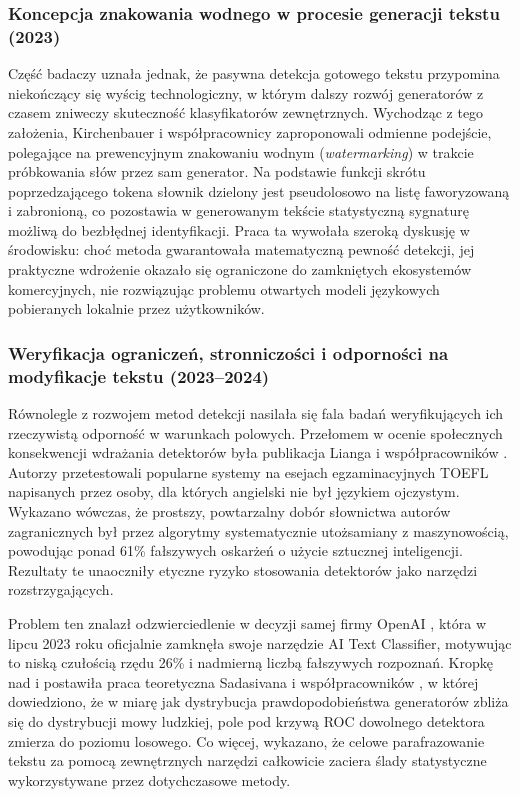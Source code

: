 \subsubsection{Koncepcja znakowania wodnego w procesie generacji tekstu (2023)}

Część badaczy uznała jednak, że pasywna detekcja gotowego tekstu przypomina niekończący się wyścig technologiczny, w którym dalszy rozwój generatorów z czasem zniweczy skuteczność klasyfikatorów zewnętrznych. Wychodząc z tego założenia, Kirchenbauer i współpracownicy \cite{kirchenbauer2023watermark} zaproponowali odmienne podejście, polegające na prewencyjnym znakowaniu wodnym (\textit{watermarking}) w trakcie próbkowania słów przez sam generator. Na podstawie funkcji skrótu poprzedzającego tokena słownik dzielony jest pseudolosowo na listę faworyzowaną i zabronioną, co pozostawia w generowanym tekście statystyczną sygnaturę możliwą do bezbłędnej identyfikacji. Praca ta wywołała szeroką dyskusję w środowisku: choć metoda gwarantowała matematyczną pewność detekcji, jej praktyczne wdrożenie okazało się ograniczone do zamkniętych ekosystemów komercyjnych, nie rozwiązując problemu otwartych modeli językowych pobieranych lokalnie przez użytkowników.

\subsubsection{Weryfikacja ograniczeń, stronniczości i odporności na modyfikacje tekstu (2023--2024)}

Równolegle z rozwojem metod detekcji nasilała się fala badań weryfikujących ich rzeczywistą odporność w warunkach polowych. Przełomem w ocenie społecznych konsekwencji wdrażania detektorów była publikacja Lianga i współpracowników \cite{liang2023gptdetectors}. Autorzy przetestowali popularne systemy na esejach egzaminacyjnych TOEFL napisanych przez osoby, dla których angielski nie był językiem ojczystym. Wykazano wówczas, że prostszy, powtarzalny dobór słownictwa autorów zagranicznych był przez algorytmy systematycznie utożsamiany z maszynowością, powodując ponad 61\% fałszywych oskarżeń o użycie sztucznej inteligencji. Rezultaty te unaoczniły etyczne ryzyko stosowania detektorów jako narzędzi rozstrzygających.

Problem ten znalazł odzwierciedlenie w decyzji samej firmy OpenAI \cite{openai2023classifier}, która w lipcu 2023 roku oficjalnie zamknęła swoje narzędzie AI Text Classifier, motywując to niską czułością rzędu 26\% i nadmierną liczbą fałszywych rozpoznań. Kropkę nad i postawiła praca teoretyczna Sadasivana i współpracowników \cite{sadasivan2023can}, w której dowiedziono, że w miarę jak dystrybucja prawdopodobieństwa generatorów zbliża się do dystrybucji mowy ludzkiej, pole pod krzywą ROC dowolnego detektora zmierza do poziomu losowego. Co więcej, wykazano, że celowe parafrazowanie tekstu za pomocą zewnętrznych narzędzi całkowicie zaciera ślady statystyczne wykorzystywane przez dotychczasowe metody.

